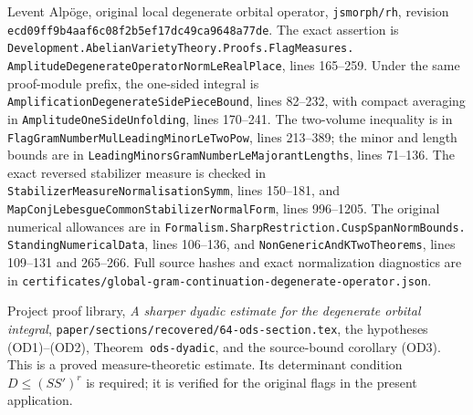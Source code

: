 Levent Alp\"oge, original local degenerate orbital operator,
\texttt{jsmorph/rh}, revision
\texttt{ecd09ff9b4aaf6c08f2b5ef17dc49ca9648a77de}.
The exact assertion is
\texttt{Development.AbelianVarietyTheory.Proofs.FlagMeasures.}
\texttt{AmplitudeDegenerateOperatorNormLeRealPlace},
lines 165--259.
Under the same proof-module prefix, the one-sided integral is
\texttt{AmplificationDegenerateSidePieceBound}, lines 82--232,
with compact averaging in \texttt{AmplitudeOneSideUnfolding},
lines 170--241.
The two-volume inequality is in
\texttt{FlagGramNumberMulLeadingMinorLeTwoPow}, lines 213--389;
the minor and length bounds are in
\texttt{LeadingMinorsGramNumberLeMajorantLengths}, lines 71--136.
The exact reversed stabilizer measure is checked in
\texttt{StabilizerMeasureNormalisationSymm}, lines 150--181, and
\texttt{MapConjLebesgueCommonStabilizerNormalForm},
lines 996--1205.
The original numerical allowances are in
\texttt{Formalism.SharpRestriction.CuspSpanNormBounds.}
\texttt{StandingNumericalData}, lines 106--136, and
\texttt{NonGenericAndKTwoTheorems}, lines 109--131 and 265--266.
Full source hashes and exact normalization diagnostics are in
\texttt{certificates/global-gram-continuation-degenerate-operator.json}.

Project proof library, \emph{A sharper dyadic estimate for the
degenerate orbital integral},
\texttt{paper/sections/recovered/64-ods-section.tex},
the hypotheses (OD1)--(OD2), Theorem~\texttt{ods-dyadic},
and the source-bound corollary (OD3).
This is a proved measure-theoretic estimate.  Its determinant
condition $D\le(SS')^r$ is required; it is verified for the
original flags in the present application.
